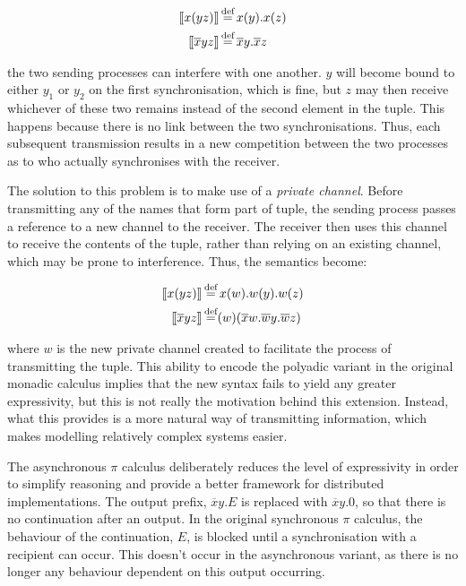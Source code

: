\begin{align}
\seml x(yz) \semr & \eqdef x(y).x(z) \\
\seml \overline{x}yz \semr & \eqdef \overline{x}y.\overline{x}z
\end{align}

\noindent the two sending processes can interfere with one another.
$y$ will become bound to either $y_1$ or $y_2$ on the first
synchronisation, which is fine, but $z$ may then receive whichever of
these two remains instead of the second element in the tuple.  This
happens because there is no link between the two synchronisations.
Thus, each subsequent transmission results in a new competition
between the two processes as to who actually synchronises with the
receiver.

The solution to this problem is to make use of a \emph{private
  channel}.  Before transmitting any of the names that form part of
tuple, the sending process passes a reference to a new channel to the
receiver.  The receiver then uses this channel to receive the contents
of the tuple, rather than relying on an existing channel, which may be
prone to interference.  Thus, the semantics become:

\begin{align}
\seml x(yz) \semr & \eqdef x(w).w(y).w(z) \\
\seml \overline{x}yz \semr & \eqdef (w)(\overline{x}w.\overline{w}y.\overline{w}z)
\end{align}

\noindent where $w$ is the new private channel created to facilitate
the process of transmitting the tuple.  This ability to encode the
polyadic variant in the original monadic calculus implies that the new
syntax fails to yield any greater expressivity, but this is not really
the motivation behind this extension.  Instead, what this provides is
a more natural way of transmitting information, which makes modelling
relatively complex systems easier.

The asynchronous $\pi$ calculus \cite{boudol:asynchrony,
  honda:asynchronouscommunication, sangiorgi:asynchronousprocesscalculi}
  deliberately reduces the level of expressivity in order to simplify
  reasoning and provide a better framework for distributed
  implementations.  The output prefix, $\overline{x}y.E$ is replaced
  with $\overline{x}y.0$, so that there is no continuation after an
  output.  In the original synchronous $\pi$ calculus, the behaviour of
  the continuation, $E$, is blocked until a synchronisation with a
  recipient can occur.  This doesn't occur in the asynchronous variant,
  as there is no longer any behaviour dependent on this output
  occurring.

